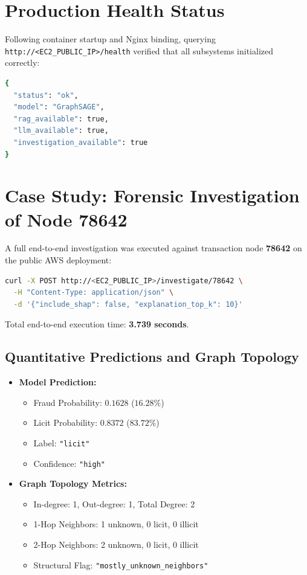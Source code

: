 \documentclass[11pt,a4paper]{report}
\begin{document}
\section{Production Health Status}
Following container startup and Nginx binding, querying \texttt{http://<EC2\_PUBLIC\_IP>/health} verified that all subsystems initialized correctly:
\begin{lstlisting}[language=bash]
{
  "status": "ok",
  "model": "GraphSAGE",
  "rag_available": true,
  "llm_available": true,
  "investigation_available": true
}
\end{lstlisting}

\section{Case Study: Forensic Investigation of Node 78642}
A full end-to-end investigation was executed against transaction node \textbf{78642} on the public AWS deployment:
\begin{lstlisting}[language=bash]
curl -X POST http://<EC2_PUBLIC_IP>/investigate/78642 \
  -H "Content-Type: application/json" \
  -d '{"include_shap": false, "explanation_top_k": 10}'
\end{lstlisting}
Total end-to-end execution time: \textbf{3.739 seconds}.

\subsection{Quantitative Predictions and Graph Topology}
\begin{itemize}[leftmargin=1.5em]
  \item \textbf{Model Prediction:}
  \begin{itemize}
    \item Fraud Probability: $0.1628$ ($16.28\%$)
    \item Licit Probability: $0.8372$ ($83.72\%$)
    \item Label: \texttt{"licit"}
    \item Confidence: \texttt{"high"}
  \end{itemize}
  \item \textbf{Graph Topology Metrics:}
  \begin{itemize}
    \item In-degree: 1, Out-degree: 1, Total Degree: 2
    \item 1-Hop Neighbors: 1 unknown, 0 licit, 0 illicit
    \item 2-Hop Neighbors: 2 unknown, 0 licit, 0 illicit
    \item Structural Flag: \texttt{"mostly\_unknown\_neighbors"}
  \end{itemize}
\end{itemize}
\end{document}
